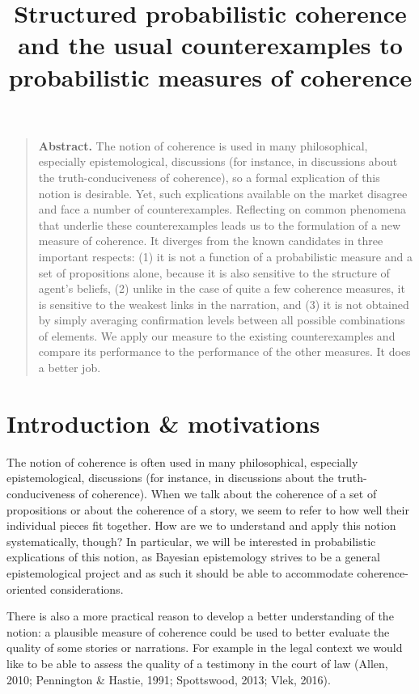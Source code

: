 \documentclass[
  10pt,
]{scrartcl}
\title{Structured probabilistic coherence \linebreak and the usual counterexamples to probabilistic measures of coherence}
\author{}
\date{\vspace{-2.5em}}
\begin{document}
\maketitle

\setlength{\abovedisplayskip}{-10pt}
\setlength{\belowdisplayskip}{5pt}

\begin{quote}\textbf{Abstract.}
The notion of coherence is  used in many philosophical, especially epistemological, discussions (for instance, in discussions  about the  truth-conduciveness of coherence), so a formal explication of this notion is desirable.  Yet,  such explications available on the market disagree and  face a number of counterexamples.  Reflecting on common phenomena that underlie these counterexamples leads  us to the formulation of  a new measure of coherence. It  diverges from the known candidates in three important respects: (1) it is not a function of a probabilistic measure and a set of propositions alone, because it is also sensitive to the structure of agent's beliefs, (2) unlike in the case of quite a few coherence measures, it is  sensitive to the  weakest links in the narration, and (3) it is not obtained by simply averaging confirmation levels between all possible combinations of elements.    We apply our measure to the existing counterexamples and compare its performance to the performance of the other measures. It does a  better job.  
\end{quote}

\hypertarget{introduction-motivations}{%
\section{Introduction \& motivations}\label{introduction-motivations}}

The notion of coherence is often used in many philosophical, especially epistemological, discussions (for instance, in discussions about the truth-conduciveness of coherence). When we talk about the coherence of a set of propositions or about the coherence of a story, we seem to refer to how well their individual pieces fit together. How are we to understand and apply this notion systematically, though? In particular, we will be interested in probabilistic explications of this notion, as Bayesian epistemology strives to be a general epistemological project and as such it should be able to accommodate coherence-oriented considerations.

There is also a more practical reason to develop a better understanding of the notion: a plausible measure of coherence could be used to better evaluate the quality of some stories or narrations. For example in the legal context we would like to be able to assess the quality of a testimony in the court of law (Allen, 2010; Pennington \& Hastie, 1991; Spottswood, 2013; Vlek, 2016).
\end{document}

